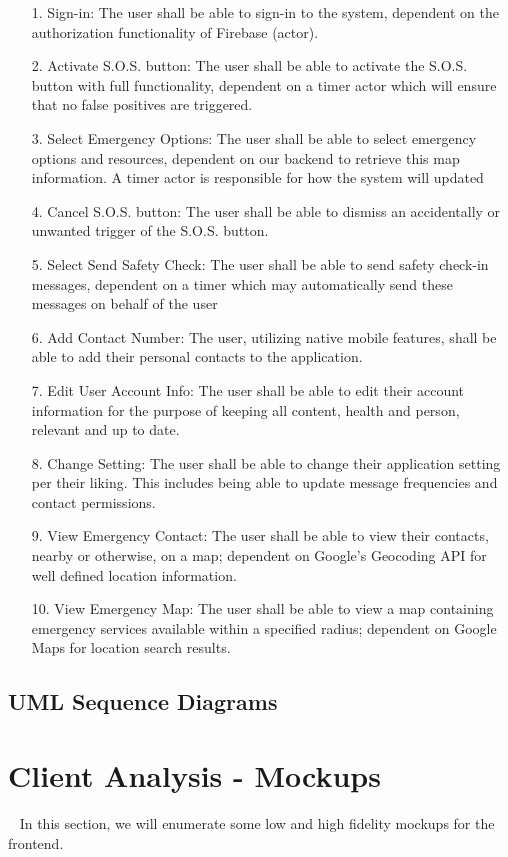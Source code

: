 \documentclass[10pt, a4paper]{article}
\begin{document}
\begin{enumerate}
	\item[1.] Sign-in: The user shall be able to sign-in to the system, dependent on the authorization functionality of Firebase (actor).
	\item[2.] Activate S.O.S. button: The user shall be able to activate the S.O.S. button with full functionality, dependent on a timer actor which will ensure that no false positives are triggered.
	\item[3.] Select Emergency Options: The user shall be able to select emergency options and resources, dependent on our backend to retrieve this map information. A timer actor is responsible for how the system will updated 
	\item[4.] Cancel S.O.S. button: The user shall be able to dismiss an accidentally or unwanted trigger of the S.O.S. button.
	\item[5.] Select Send Safety Check: The user shall be able to send safety check-in messages, dependent on a timer which may automatically send these messages on behalf of the user
	\item[6.] Add Contact Number: The user, utilizing native mobile features, shall be able to add their personal contacts to the application.
	\item[7.] Edit User Account Info: The user shall be able to edit their account information for the purpose of keeping all content, health and person, relevant and up to date.
	\item[8.] Change Setting: The user shall be able to change their application setting per their liking. This includes being able to update message frequencies and contact permissions.
	\item[9.] View Emergency Contact: The user shall be able to view their contacts, nearby or otherwise, on a map; dependent on Google's Geocoding API for well defined location information.
	\item[10.] View Emergency Map: The user shall be able to view a map containing emergency services available within a specified radius; dependent on Google Maps for location search results. 
\end{enumerate}
\subsection{UML Sequence Diagrams}
\section{Client Analysis - Mockups}
\par ~ In this section, we will enumerate some low and high fidelity mockups for the frontend.
\end{document}
